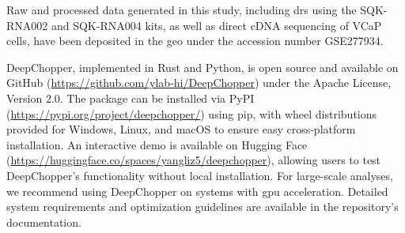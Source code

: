 \documentclass[pdflatex,sn-nature, lineno]{sn-jnl}%
\begin{document}




Raw and processed data generated in this study, including \gls{drs} using the SQK-RNA002 and SQK-RNA004 kits, as well as direct cDNA sequencing of VCaP cells, have been deposited in the \gls{geo} under the accession number GSE277934.


DeepChopper, implemented in Rust and Python, is open source and available on GitHub (\url{https://github.com/ylab-hi/DeepChopper}) under the Apache License, Version 2.0.
The package can be installed via PyPI (\url{https://pypi.org/project/deepchopper/}) using pip, with wheel distributions provided for Windows, Linux, and macOS to ensure easy cross-platform installation.
An interactive demo is available on Hugging Face (\url{https://huggingface.co/spaces/yangliz5/deepchopper}), allowing users to test DeepChopper's functionality without local installation.
For large-scale analyses, we recommend using DeepChopper on systems with \gls{gpu} acceleration. Detailed system requirements and optimization guidelines are available in the repository's documentation.
\end{document}
